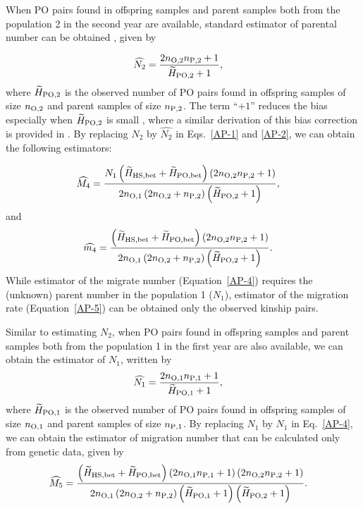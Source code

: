 \documentclass[12pt, English]{article}
\begin{document}
\begin{spacing}{1.9}
When PO pairs found in offspring samples and parent samples both from the population 2 in the second year are available, standard estimator of parental number can be obtained \cite[]{bravington2016close}, given by

\begin{align}
\widehat{N_2} &= \frac{ 2 n_{\rm O, 2} n_{\rm P, 2} + 1 }{\widetilde{H}_{\rm PO, 2} + 1} ,
\label{AP-3}
\end{align}
where $\widetilde{H}_{\rm PO, 2}$ is the observed number of PO pairs found in offspring samples of size $n_{\rm O, 2}$ and parent samples of size $n_{\rm P, 2}$. The term ``$+1$'' reduces the bias especially when $\widetilde{H}_{\rm PO, 2}$ is small \cite[e.g.,][]{ecolevol2021p}, where a similar derivation of this bias correction is provided in \cite{Akita_2019}. By replacing $N_2$ by $\widehat{N_2}$ in Eqs.~\ref{AP-1} and \ref{AP-2}, we can obtain the following estimators: 

\begin{align}
\widehat{M_4} &=  \frac{ N_{1} \left(\widetilde{H}_{\rm HS,bet} + \widetilde{H}_{\rm PO,bet}\right) \left(2 n_{\rm O, 2} n_{\rm P, 2} + 1\right)} {2n_{\rm O, 1} \left(2 n_{\rm O, 2} + n_{\rm P, 2}\right) \left(\widetilde{H}_{\rm PO, 2} + 1\right)},
\label{AP-4}
\end{align}
and
\begin{align}
\widehat{m_4} &=  \frac{ \left(\widetilde{H}_{\rm HS,bet} + \widetilde{H}_{\rm PO,bet}\right) \left(2 n_{\rm O, 2} n_{\rm P, 2} + 1\right)} {2n_{\rm O, 1} \left(2 n_{\rm O, 2} + n_{\rm P, 2}\right) \left(\widetilde{H}_{\rm PO, 2} + 1\right)}.
\label{AP-5}
\end{align}
While estimator of the migrate number (Equation~\ref{AP-4}) requires the (unknown) parent number in the population 1 ($N_{1}$), estimator of the migration rate (Equation~\ref{AP-5}) can be obtained only the observed kinship pairs. 

Similar to estimating $N_2$, when PO pairs found in offspring samples and parent samples both from the population 1 in the first year are also available, we can obtain the estimator of $N_1$, written by
\begin{align}
\widehat{N_1} &= \frac{ 2 n_{\rm O, 1} n_{\rm P, 1} + 1 }{\widetilde{H}_{\rm PO, 1} + 1},
\label{AP-6}
\end{align}
where $\widetilde{H}_{\rm PO, 1}$ is the observed number of PO pairs found in offspring samples of size $n_{\rm O, 1}$ and parent samples of size $n_{\rm P, 1}$. By replacing $N_1$ by $\widehat{N_1}$ in Eq.~\ref{AP-4}, we can obtain the estimator of migration number that can be calculated only from genetic data, given by
\begin{align}
\widehat{M_5} &=  \frac{ \left(\widetilde{H}_{\rm HS,bet} + \widetilde{H}_{\rm PO,bet}\right) \left(2 n_{\rm O, 1} n_{\rm P, 1} + 1\right) \left(2 n_{\rm O, 2} n_{\rm P, 2} + 1\right)} {2n_{\rm O, 1} \left(2 n_{\rm O, 2} + n_{\rm P, 2}\right) \left(\widetilde{H}_{\rm PO, 1} + 1\right) \left(\widetilde{H}_{\rm PO, 2} + 1\right)}.
\label{AP-7}
\end{align}


\end{spacing}
\end{document}
